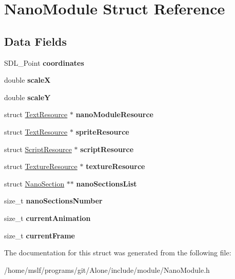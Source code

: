 \hypertarget{struct_nano_module}{}\section{Nano\+Module Struct Reference}
\label{struct_nano_module}
\subsection*{Data Fields}
\begin{DoxyCompactItemize}
\item 
\hypertarget{struct_nano_module_a667ad041f76f3b99c2ea65cd78b668ea}{}\label{struct_nano_module_a667ad041f76f3b99c2ea65cd78b668ea} 
S\+D\+L\+\_\+\+Point {\bfseries coordinates}
\item 
\hypertarget{struct_nano_module_af04d6c916584bdddd6a334359ff1059d}{}\label{struct_nano_module_af04d6c916584bdddd6a334359ff1059d} 
double {\bfseries scaleX}
\item 
\hypertarget{struct_nano_module_a936cc64e631dcd2b4ea124d5d8d4fe38}{}\label{struct_nano_module_a936cc64e631dcd2b4ea124d5d8d4fe38} 
double {\bfseries scaleY}
\item 
\hypertarget{struct_nano_module_ada202611939c35f57e7b4945b998fa83}{}\label{struct_nano_module_ada202611939c35f57e7b4945b998fa83} 
struct \hyperlink{struct_text_resource}{Text\+Resource} $\ast$ {\bfseries nano\+Module\+Resource}
\item 
\hypertarget{struct_nano_module_ac402150bd2243d7a6f04756f7b624fa1}{}\label{struct_nano_module_ac402150bd2243d7a6f04756f7b624fa1} 
struct \hyperlink{struct_text_resource}{Text\+Resource} $\ast$ {\bfseries sprite\+Resource}
\item 
\hypertarget{struct_nano_module_abc27117170d75eb9af11c98fd2d5d855}{}\label{struct_nano_module_abc27117170d75eb9af11c98fd2d5d855} 
struct \hyperlink{struct_script_resource}{Script\+Resource} $\ast$ {\bfseries script\+Resource}
\item 
\hypertarget{struct_nano_module_aedd0da0c072332f83e64105f8682bbdf}{}\label{struct_nano_module_aedd0da0c072332f83e64105f8682bbdf} 
struct \hyperlink{struct_texture_resource}{Texture\+Resource} $\ast$ {\bfseries texture\+Resource}
\item 
\hypertarget{struct_nano_module_aec63f87f8d4f3afbfdb13d8f6ad16a9b}{}\label{struct_nano_module_aec63f87f8d4f3afbfdb13d8f6ad16a9b} 
struct \hyperlink{struct_nano_section}{Nano\+Section} $\ast$$\ast$ {\bfseries nano\+Sections\+List}
\item 
\hypertarget{struct_nano_module_add9bc2388f3bad3d94c9912c38730980}{}\label{struct_nano_module_add9bc2388f3bad3d94c9912c38730980} 
size\+\_\+t {\bfseries nano\+Sections\+Number}
\item 
\hypertarget{struct_nano_module_a712df7aeb9afad06723b1d6039536010}{}\label{struct_nano_module_a712df7aeb9afad06723b1d6039536010} 
size\+\_\+t {\bfseries current\+Animation}
\item 
\hypertarget{struct_nano_module_a3ff28beecee781f499b33b0884780b85}{}\label{struct_nano_module_a3ff28beecee781f499b33b0884780b85} 
size\+\_\+t {\bfseries current\+Frame}
\end{DoxyCompactItemize}


The documentation for this struct was generated from the following file\+:\begin{DoxyCompactItemize}
\item 
/home/mslf/programs/git/\+Alone/include/module/Nano\+Module.\+h\end{DoxyCompactItemize}
